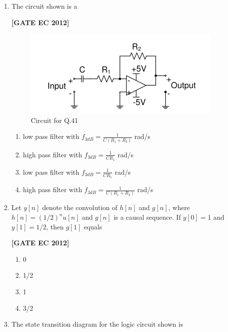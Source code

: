 \documentclass[12pt]{article}
\begin{document}
\begin{enumerate}[leftmargin=1.0em, label=\textbf{Q.\arabic*.}, itemsep=2em]
\begin{enumerate}[leftmargin=2.5em, label=\textbf{Q.\arabic*.}, itemsep=2em, start=26]
\item The circuit shown is a

\noindent \textbf{[GATE EC 2012]}
\begin{figure}[H]\centering
\includegraphics[width=0.5\columnwidth]{figs/q41.png}
\caption{Circuit for Q.41}
\label{fig:q41}
\end{figure}
\begin{multicols}{2}
    \begin{enumerate}
        \item low pass filter with $f_{3dB} = \tfrac{1}{C(R_1+R_2)}$ rad/s
        \item high pass filter with $f_{3dB} = \tfrac{1}{CR_1}$ rad/s
        \item low pass filter with $f_{3dB} = \tfrac{1}{CR_1}$ rad/s
        \item high pass filter with $f_{3dB} = \tfrac{1}{C(R_1+R_2)}$ rad/s
    \end{enumerate}
\end{multicols}

\item Let $y[n]$ denote the convolution of $h[n]$ and $g[n]$, where $h[n] = (1/2)^n u[n]$ and $g[n]$ is a causal sequence. If $y[0]=1$ and $y[1]=1/2$, then $g[1]$ equals

\noindent \textbf{[GATE EC 2012]}
\begin{multicols}{2}
    \begin{enumerate}
        \item 0
        \item 1/2
        \item 1
        \item 3/2
    \end{enumerate}
\end{multicols}

\item The state transition diagram for the logic circuit shown is


\end{enumerate}
\end{enumerate}
\end{document}
